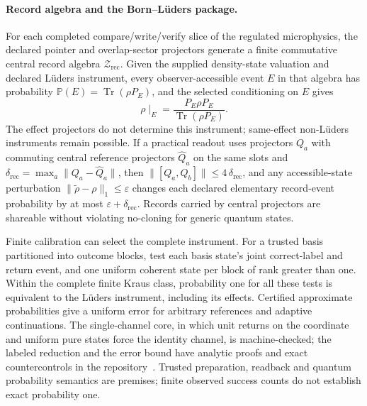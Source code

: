 \documentclass[11pt]{article}
\begin{document}
\paragraph{Record algebra and the Born--L\"uders package.}
For each completed compare/write/verify slice of the regulated microphysics,
the declared pointer and overlap-sector projectors generate a finite
commutative central record algebra \(\mathcal Z_{\mathrm{rec}}\). Given the
supplied density-state valuation and declared L\"uders instrument, every
observer-accessible event \(E\) in that algebra has probability
\(\mathbb P(E)=\operatorname{Tr}(\rho P_E)\), and the selected conditioning on
\(E\) gives
\[
\rho\!\mid_E = \frac{P_E \rho P_E}{\operatorname{Tr}(\rho P_E)}.
\]
The effect projectors do not determine this instrument; same-effect
non-L\"uders instruments remain possible. If a practical readout uses
projectors \(Q_a\) with commuting central reference projectors
\(\widehat Q_a\) on the same slots and
\(\delta_{\mathrm{rec}}=\max_a \|Q_a-\widehat Q_a\|\), then
\(\|[Q_a,Q_b]\|\le 4\,\delta_{\mathrm{rec}}\), and any accessible-state
perturbation \(\|\widetilde\rho-\rho\|_1\le\varepsilon\) changes each declared
elementary record-event probability by at most \(\varepsilon+\delta_{\mathrm{rec}}\).
Records carried by central projectors are shareable without violating
no-cloning for generic quantum states.

Finite calibration can select the complete instrument. For a trusted basis
partitioned into outcome blocks, test each basis state's joint correct-label
and return event, and one uniform coherent state per block of rank greater
than one. Within the complete finite Kraus class, probability one for all
these tests is equivalent to the L\"uders instrument, including its effects.
Certified approximate probabilities give a uniform error for arbitrary
references and adaptive continuations. The single-channel core, in which unit
returns on the coordinate and uniform pure states force the identity channel,
is machine-checked; the labeled reduction and the error bound have analytic
proofs and exact countercontrols in the repository~\cite{ophrepo}. Trusted preparation,
readback and quantum probability semantics are premises; finite observed
success counts do not establish exact probability one.
\end{document}
